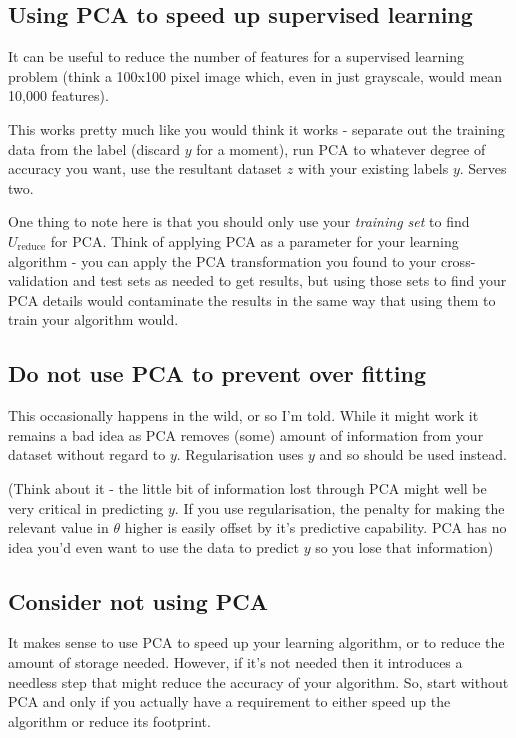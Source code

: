 \subsection{Using PCA to speed up supervised learning}
It can be useful to reduce the number of features for a supervised learning problem (think a 100x100 pixel image which, even in just grayscale, would mean 10,000 features).

This works pretty much like you would think it works - separate out the training data from the label (discard $y$ for a moment), run PCA to whatever degree of accuracy you want, use the resultant dataset $z$ with your existing labels $y$. Serves two.

One thing to note here is that you should only use your \emph{training set} to find $U_{\textrm{reduce}}$ for PCA. Think of applying PCA as a parameter for your learning algorithm - you can apply the PCA transformation you found to your cross-validation and  test sets as needed to get results, but using those sets to find your PCA details would contaminate the results in the same way that using them to train your algorithm would.

\subsection{Do not use PCA to prevent over fitting}

This occasionally happens in the wild, or so I'm told. While it might work it remains a bad idea as PCA removes (some) amount of information from your dataset without regard to $y$. Regularisation uses $y$ and so should be used instead.

(Think about it - the little bit of information lost through PCA might well be very critical in predicting $y$. If you use regularisation, the penalty for making the relevant value in $\theta$ higher is easily offset by it's predictive capability. PCA has no idea you'd even want to use the data to predict $y$ so you lose that information)

\subsection{Consider not using PCA}

It makes sense to use PCA to speed up your learning algorithm, or to reduce the amount of storage needed. However, if it's not needed then it introduces a needless step that might reduce the accuracy of your algorithm. So, start without PCA and only if you actually have a requirement to either speed up the algorithm or reduce its footprint.